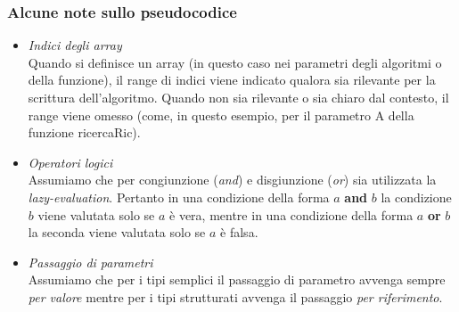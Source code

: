 \subsubsection{Alcune note sullo pseudocodice}
\begin{itemize}
    \item {\emph{Indici degli array}}\\
    Quando si definisce un array (in questo caso nei parametri degli algoritmi o della funzione), 
    il range di indici viene indicato qualora sia rilevante per la scrittura dell’algoritmo. 
    Quando non sia rilevante o sia chiaro dal contesto, il range viene omesso 
    (come, in questo esempio, per il parametro A della funzione ricercaRic).

    \item {\emph{Operatori logici}}\\
    Assumiamo che per congiunzione ({\emph{and}}) e disgiunzione ({\emph{or}}) sia utilizzata la 
    {\emph{lazy-evaluation}}. Pertanto in una condizione della forma 
    $a$ {\textbf{and}} $b$ la condizione $b$ viene valutata solo se $a$ è vera, 
    mentre in una condizione della forma $a$ {\textbf{or}} $b$ la seconda viene valutata solo se $a$ è falsa.

    \item {\emph{Passaggio di parametri}}\\
    Assumiamo che per i tipi semplici il passaggio di parametro avvenga sempre
    {\emph{per valore}} mentre per i tipi strutturati avvenga il passaggio {\emph{per riferimento}}.

    
\end{itemize}

\clearpage
